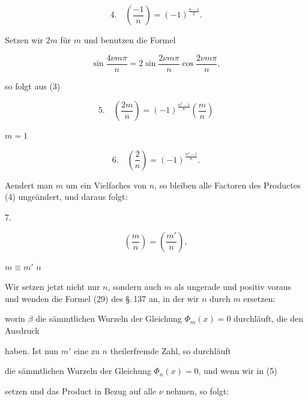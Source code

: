 \[
4.\quad \left(\frac{-1}{n}\right) = (-1)^{\frac{n-1}{2}}.
\]

Setzen wir $2m$ für $m$ und benutzen die Formel

\[
\sin \frac{4\nu m \pi}{n} = 2 \sin \frac{2\nu m \pi}{n} \cos \frac{2\nu m \pi}{n},
\]

so folgt aus (3)

\[
5.\quad \left(\frac{2m}{n}\right) = (-1)^{\frac{n^2-1}{8}} \left(\frac{m}{n}\right)
\]

 $m = 1$

\[
6.\quad \left(\frac{2}{n}\right) = (-1)^{\frac{n^2-1}{8}}.
\]

Aendert man $m$ um ein Vielfaches von $n$, so bleiben alle
Factoren des Productes (4) ungeändert, und daraus folgt:

7. 

\[
\left(\frac{m}{n}\right) = \left(\frac{m'}{n}\right),
\]

 $m \equiv m'$  $n$

Wir setzen jetzt nicht nur $n$, sondern auch $m$ als ungerade
und positiv voraus und wenden die Formel (29) des \S.\,137 an,
in der wir $n$ durch $m$ ersetzen:


worin $\beta$ die sämmtlichen Wurzeln der Gleichung $\Phi_m(x) = 0$
durchläuft, die den Ausdruck


haben. Ist nun $m'$ eine zu $n$ theilerfremde Zahl, so durchläuft


die sämmtlichen Wurzeln der Gleichung $\Phi_n(x) = 0$, und wenn
wir in (5)


setzen und das Product in Bezug auf alle $\nu$ nehmen, so folgt:

